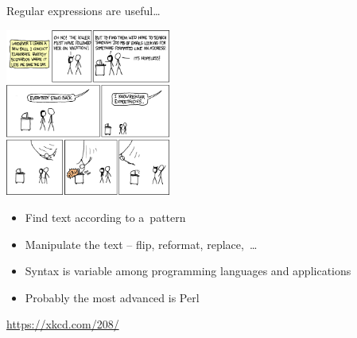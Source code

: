 \documentclass[compress, ucs, xelatex, 11pt, xcolor=svgnames,
  hyperref={
    bookmarks=true,
    unicode=true,
    colorlinks=true,
    pdftitle={Linux, command line and MetaCentrum},
    plainpages=false,
    pdfauthor={Vojtech Zeisek},
    pdfsubject={Course about use of Linux command line, writing shell scripts and using MetaCentrum of CESNET},
    pdfcreator={XeLaTeX},
    pdfkeywords={Linux, GNU, BASH, shell, command line, MetaCentrum},
    linkcolor=DarkRed,
    anchorcolor=DarkBlue,
    citecolor=Indigo,
    filecolor=NavyBlue,
    menucolor=DarkMagenta,
    urlcolor=DarkBlue,
    pdftex},
  url={hyphens, lowtilde} %
  ]{beamer}
\begin{document}
\begin{frame}{Regular expressions are useful\ldots}
  \begin{multicols}{2}
    \begin{center}
      \includegraphics[height=5.5cm]{regular_expressions.png}
    \end{center}
    \columnbreak
    \begin{itemize}
      \item Find text according to a~pattern
      \item Manipulate the text -- flip, reformat, replace,~\ldots
      \item Syntax is variable among programming languages and applications
      \item Probably the most advanced is Perl
    \end{itemize}
    \vfill
    \url{https://xkcd.com/208/}
  \end{multicols}
\end{frame}
\end{document}
